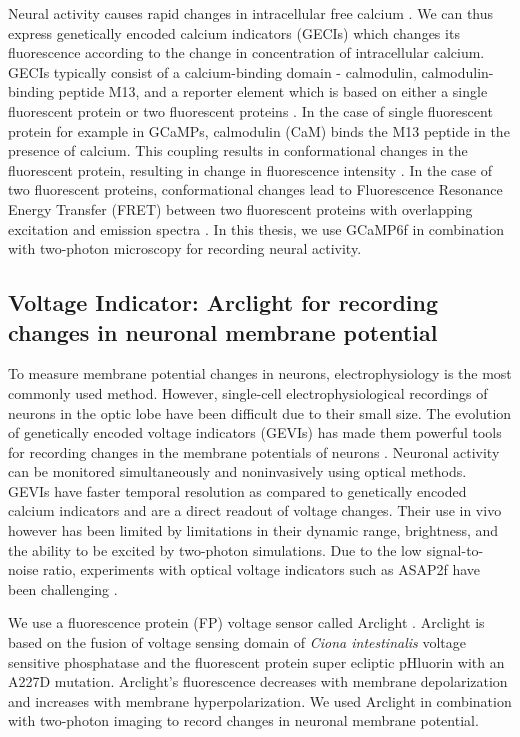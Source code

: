 Neural activity causes rapid changes in intracellular free calcium \parencite{Baker1971, Sabatini2002, Egelhaaf1995}. We can thus express genetically encoded calcium indicators (GECIs) which changes its fluorescence according to the change in concentration of intracellular calcium. GECIs typically consist of a calcium-binding domain - calmodulin, calmodulin-binding peptide M13, and a reporter element which is based on either a single fluorescent protein or two fluorescent proteins \parencite{Broussard2014}. In the case of single fluorescent protein for example in GCaMPs, calmodulin (CaM) binds the M13 peptide in the presence of calcium. This coupling results in conformational changes in the fluorescent protein, resulting in change in fluorescence intensity \parencite{Nagai2001}. In the case of two fluorescent proteins, conformational changes lead to Fluorescence Resonance Energy Transfer (FRET) between two fluorescent proteins with overlapping excitation and emission spectra \parencite{Miyawaki1997}. In this thesis, we use GCaMP6f  \parencite{Chen2013} in combination with two-photon microscopy for recording neural activity.

\subsection{Voltage Indicator: Arclight for recording changes in neuronal membrane potential}
To measure membrane potential changes in neurons, electrophysiology is the most commonly used method. However, single-cell electrophysiological recordings of neurons in the optic lobe have been difficult due to their small size. The evolution of genetically encoded voltage indicators (GEVIs) has made them powerful tools for recording changes in the membrane potentials of neurons \parencite{Yang2016}. Neuronal activity can be monitored simultaneously and noninvasively using optical methods. GEVIs have faster temporal resolution as compared to genetically encoded calcium indicators and are a direct readout of voltage changes. Their use in vivo however has been limited by limitations in their dynamic range, brightness, and the ability to be excited by two-photon simulations. Due to the low signal-to-noise ratio, experiments with optical voltage indicators such as ASAP2f have been challenging \parencite{Yang2016}.

We use a fluorescence protein (FP) voltage sensor called Arclight \parencite{Jin2012}. Arclight is based on the fusion of voltage sensing domain of \textit{Ciona intestinalis} voltage sensitive phosphatase \parencite{Murata2005} and the fluorescent protein super ecliptic pHluorin with an A227D mutation. Arclight's fluorescence decreases with membrane depolarization and increases with membrane hyperpolarization. We used Arclight in combination with two-photon imaging to record changes in neuronal membrane potential.

